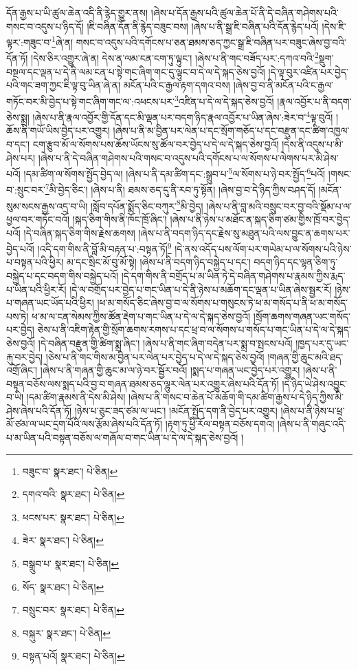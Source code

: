 དོན་རྒྱས་པ་ཡི་ཚུལ་ཆེན་འདི་ནི་རྙེད་གྱུར་ནས། །ཞེས་པ་དོན་རྒྱས་པའི་ཚུལ་ཆེན་པོ་ནི་དེ་བཞིན་གཤེགས་པའི་གསང་བ་འདུས་པ་ཉིད་དོ། །ཇི་བཞིན་དོན་ནི་རྙེད་བཟུང་བས། །ཞེས་པ་ནི་སྒྲ་ཇི་བཞིན་པའི་དོན་རྙེད་པའོ། །དེས་ཇི་ལྟར་:གཟུང་བ་\footnote{བཟུང་བ་  སྣར་ཐང་།  པེ་ཅིན། }ཞེ་ན། གསང་བ་འདུས་པའི་དགོངས་པ་ཅན་ཐམས་ཅད་ཀྱང་སྒྲ་ཇི་བཞིན་པར་བཟུང་ཞེས་བྱ་བའི་དོན་ཏོ། །དེས་ཅིར་འགྱུར་ཞེ་ན། དེས་ན་ལམ་ངན་ངག་ཏུ་ལྟུང་། །ཞེས་པ་ནི་གང་བཟོད་པར་:དཀའ་བའི་\footnote{དགའ་བའི་  སྣར་ཐང་།  པེ་ཅིན། }སྡུག་བསྔལ་དང་ལྡན་པ་དེ་ནི་ལམ་ངན་པ་སྟེ་གང་ཞིག་གང་དུ་ལྟུང་བ་དེ་ལ་དེ་སྐད་ཅེས་བྱའོ། །དེ་ལྟ་བུར་འཛིན་པར་བྱེད་པའི་གང་ཟག་ཀྱང་ཇི་ལྟ་བུ་ཡིན་ཞེ་ན། མངོན་པའི་ང་རྒྱལ་རྟག་དགའ་བས། །ཞེས་བྱ་བ་ནི་མངོན་པའི་ང་རྒྱལ་གཏོང་བར་མི་བྱེད་པ་སྟེ་གང་ཞིག་གང་ལ་:འཕངས་པར་\footnote{ཕངས་པར་  སྣར་ཐང་།  པེ་ཅིན། }འཛིན་པ་དེ་ལ་དེ་སྐད་ཅེས་བྱའོ། །རྣལ་འབྱོར་པ་ནི་བདག་ཅེས་སྨྲ། །ཞེས་པ་ནི་རྣལ་འབྱོར་གྱི་དོན་དང་མི་ལྡན་པར་བདག་ཉིད་རྣལ་འབྱོར་པ་ཡིན་ཞེས་:ཟེར་བ་\footnote{ཟེར་  སྣར་ཐང་།  པེ་ཅིན། }ལྟ་བུའོ། །ཆོས་ནི་གཡོ་ཡིས་བྱེད་པར་འགྱུར། །ཞེས་པ་ནི་མ་བྱིན་པར་ལེན་པ་དང་སྲོག་གཅོད་པ་དང་བརྫུན་དང་ཚིག་འཁྱལ་བ་དང་། ངག་རྩུབ་མོ་ལ་སོགས་པས་ཆོས་ཡོངས་སུ་ཚོལ་བར་བྱེད་པ་དེ་ལ་དེ་སྐད་ཅེས་བྱའོ། །དེས་ནི་འདུས་པ་མི་ཤེས་པར། །ཞེས་པ་ནི་དེ་བཞིན་གཤེགས་པའི་གསང་བ་འདུས་པའི་དགོངས་པ་ལ་སོགས་པ་ལེགས་པར་མི་ཤེས་པའོ། །དམ་ཚིག་ལ་སོགས་སྤྱོད་བྱེད་ལ། །ཞེས་པ་ནི་དམ་ཚིག་དང་:སྒྲུབ་པ་\footnote{བསྒྲུབ་པ་  སྣར་ཐང་།  པེ་ཅིན། }ལ་སོགས་པ་ཉེ་བར་སྤྱོད་\footnote{སོད་  སྣར་ཐང་།  པེ་ཅིན། }པའོ། །གསང་བ་:སྲུང་བར་\footnote{བསྲུང་བར་  སྣར་ཐང་།  པེ་ཅིན། }མི་བྱེད་ཅིང་། །ཞེས་པ་ནི། ཐམས་ཅད་དུ་ནི་རབ་ཏུ་སྟོན། །ཞེས་བྱ་བ་དེ་ཉིད་ཀྱིས་བཤད་དོ། །མངོན་སུམ་སངས་རྒྱས་འདྲ་བ་ཡི། །སློབ་དཔོན་སྨོད་ཅིང་བཀུར་\footnote{བསྐུར་  སྣར་ཐང་།  པེ་ཅིན། }མི་བྱེད། །ཞེས་པ་ནི་བླ་མའི་བསྲུང་བར་བྱ་བའི་སྡོམ་པ་ལ་ཕྱལ་བར་གཏོང་བའོ། །སྐད་ཅིག་གིས་ནི་ཁོང་ཁྲོ་ཞིང་། །ཞེས་པ་ནི་ཉེས་པ་མཐོང་ན་སྐད་ཅིག་ཙམ་གྱིས་ཁྲོ་བར་བྱེད་པའོ། །དེ་བཞིན་སྐད་ཅིག་གིས་རྗེས་ཆགས། །ཞེས་པ་ནི་བདག་ཉིད་དང་རྗེས་སུ་མཐུན་པའི་ལས་བྱུང་ན་ཆགས་པར་བྱེད་པའོ། །འདི་དག་གིས་ནི་བློ་མི་བརྟན་པ་:བསྟན་ཏོ།\footnote{བསྟན་པའོ།  སྣར་ཐང་།  པེ་ཅིན། } །དེ་ནས་འདོད་པས་ལོག་པར་གཡེམ་པ་ལ་སོགས་པའི་ཉེས་པ་བསྟན་པའི་ཕྱིར། མ་དང་སྲིང་མོ་བུ་མོ་སྟེ། །ཞེས་པ་ནི་བདག་ཉིད་བསྐྱེད་པ་དང་། བདག་ཉིད་དང་ལྷན་ཅིག་ཏུ་བསྐྱེད་པ་དང་བདག་གིས་བསྐྱེད་པའོ། །དེ་དག་གིས་ནི་བགྲོད་པ་མ་ཡིན་ཏེ་དེ་བཞིན་གཤེགས་པ་རྣམས་ཀྱིས་རྨད་པ་ཡིན་པའི་ཕྱིར་རོ། །དེ་ལ་བགྲོད་པར་བྱེད་པ་གང་ཡིན་པ་དེ་ནི་ཉེས་པ་མཆོག་དང་ལྡན་པ་ཡིན་ཞེས་སྦྱར་རོ། །ཉེས་པ་གཞན་ཡང་ཡོད་པའི་ཕྱིར། །ཕ་མ་གསོད་ཅིང་ཞེས་བྱ་བ་ལ་སོགས་པ་གསུངས་ཏེ་ཕ་མ་གསོད་པ་ནི་ཕ་མ་གསོད་པས་ཏེ། ཕ་མ་ལ་ངན་སེམས་ཀྱིས་ཚོན་རྡེག་པ་གང་ཡིན་པ་དེ་ལ་དེ་སྐད་ཅེས་བྱའོ། །སྲོག་ཆགས་གཞན་ཡང་གསོད་པར་བྱེད། ཅེས་པ་ནི་འཇིག་རྟེན་གྱི་སྲོག་ཆགས་རགས་པ་དང་ཕྲ་བ་ལ་སོགས་པ་གསོད་པ་གང་ཡིན་པ་དེ་ལ་དེ་སྐད་ཅེས་བྱའོ། །དེ་བཞིན་བརྫུན་གྱི་ཚིག་སྨྲ་ཞིང་། །ཞེས་པ་ནི་གང་ཞིག་བདེན་པར་སྨྲ་བ་སྤངས་པའོ། །ཁྱད་པར་དུ་ཡང་རྐུ་བར་བྱེད། །ཅེས་པ་ནི་གང་གིས་མ་བྱིན་པར་ལེན་པར་བྱེད་པ་དེ་ལ་དེ་སྐད་ཅེས་བྱའོ། །གཞན་གྱི་ཆུང་མའི་ཐད་འགྲོ་ཞིང་། །ཞེས་པ་ནི་གཞན་གྱི་ཆུང་མ་ལ་ཉེ་བར་སྦྱོར་བའོ། །སྨད་པ་གཞན་ཡང་བྱེད་པར་འགྱུར། །ཞེས་པ་ནི་བསྟན་བཅོས་ལས་སྨད་པའི་བྱ་བ་གཞན་ཐམས་ཅད་ལྷུར་ལེན་པར་འགྱུར་ཞེས་པའི་དོན་ཏོ། །དེ་ཉིད་ཡེ་ཤེས་འབྱུང་བ་ཡི། །དམ་ཚིག་རྣམས་ནི་དེས་མི་ཤེས། །ཞེས་པ་ནི་གསང་བ་ཆེན་པོ་མཆོག་གི་དམ་ཚིག་རྒྱས་པ་དེ་ཉིད་ཀྱིས་མི་ཤེས་ཞེས་པའི་དོན་ཏོ། །ཉེས་པ་ཅུང་ཟད་ཙམ་ལ་ཡང་། །མངོན་སྤྱོད་དག་ནི་བྱེད་པར་འགྱུར། །ཞེས་པ་ནི་ཉེས་པ་ཕྲ་མོ་ཙམ་ལ་ཡང་དྲག་པོའི་ལས་རྩོམ་ཞེས་པའི་དོན་ཏོ། །རྟག་ཏུ་ཕྱི་རོལ་བསྟན་བཅོས་དགའ། །ཞེས་པ་ནི་གཞུང་འདི་པ་མ་ཡིན་པའི་བསྟན་བཅོས་ལ་གཞོལ་བ་གང་ཡིན་པ་དེ་ལ་དེ་སྐད་ཅེས་བྱའོ། །
